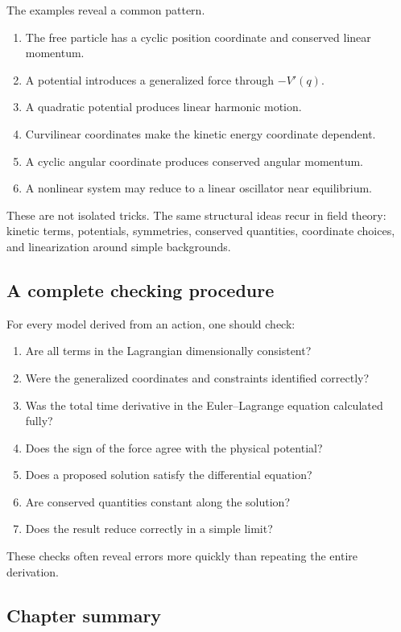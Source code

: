 The examples reveal a common pattern.

\begin{enumerate}
    \item The free particle has a cyclic position coordinate and conserved linear momentum.
    \item A potential introduces a generalized force through \(-V'(q)\).
    \item A quadratic potential produces linear harmonic motion.
    \item Curvilinear coordinates make the kinetic energy coordinate dependent.
    \item A cyclic angular coordinate produces conserved angular momentum.
    \item A nonlinear system may reduce to a linear oscillator near equilibrium.
\end{enumerate}

These are not isolated tricks. The same structural ideas recur in field theory: kinetic terms, potentials, symmetries, conserved quantities, coordinate choices, and linearization around simple backgrounds.

\subsection{A complete checking procedure}

For every model derived from an action, one should check:

\begin{enumerate}
    \item Are all terms in the Lagrangian dimensionally consistent?
    \item Were the generalized coordinates and constraints identified correctly?
    \item Was the total time derivative in the Euler--Lagrange equation calculated fully?
    \item Does the sign of the force agree with the physical potential?
    \item Does a proposed solution satisfy the differential equation?
    \item Are conserved quantities constant along the solution?
    \item Does the result reduce correctly in a simple limit?
\end{enumerate}

These checks often reveal errors more quickly than repeating the entire derivation.

\subsection{Chapter summary}

